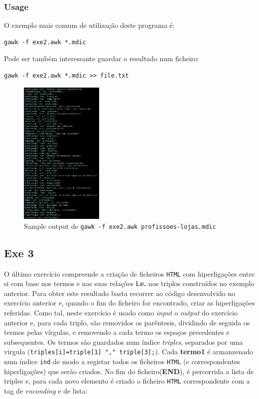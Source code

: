 \documentclass{llncs}
\begin{document}
\subsubsection{Usage}
O exemplo mais comum de utilização deste programa é:
\begin{verbatim}
gawk -f exe2.awk *.mdic
\end{verbatim}
Pode ser também interessante guardar o resultado num ficheiro:
\begin{verbatim}
gawk -f exe2.awk *.mdic >> file.txt
\end{verbatim}

\begin{figure}[H]
    \centering
    \includegraphics[height=7cm]{Exe2Out.png}
    \caption{Sample output de \texttt{gawk -f exe2.awk profissoes-lojas.mdic}}
\end{figure}

\subsection{Exe 3}
O último exercício compreende a criação de ficheiros \texttt{HTML} com hiperligações entre si com base nos termos e nas suas relações \textbf{i.e.} nos triplos construídos no exemplo anterior. Para obter este resultado basta recorrer ao código desenvolvido no exercício anterior e, quando o fim do ficheiro for encontrado, criar as hiperligações referidas. 
Como tal, neste exercício é usado como \textit{input} o \textit{output} do exercício anterior e, para cada triplo, são removidos os parêntesis, dividindo de seguida os termos pelas vírgulas, e removendo a cada termo os espaços precedentes e subsequentes. Os termos são guardados num índice \textit{triples}, separados por uma virgula (\verb|triples[i]=triple[1] "," triple[3];|). Cada \textbf{termo1} é armanzenado num índice \texttt{ind} de modo a registar todos os ficheiros \texttt{HTML} (e correspondentes hiperligações) que serão criados. No fim do ficheiro(\textbf{END}), é percorrida a lista de triples e, para cada novo elemento é criado o ficheiro \texttt{HTML} correspondente com a tag de \textit{enconding} e de lista:
\end{document}
